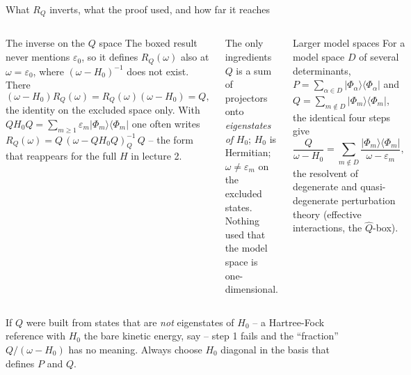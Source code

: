 \documentclass[aspectratio=169,10pt]{beamer}
\newcommand{\warnbox}[1]{%
  \begin{tcolorbox}[colback=palewarm,colframe=warm,title={\bfseries A trap to avoid}]
  #1
  \end{tcolorbox}}
\newcommand{\ketbra}[2]{\vert #1\rangle\langle #2\vert}
\begin{document}
\begin{frame}[shrink=15]{What \(R_Q\) inverts, what the proof used, and how far it reaches}
\begin{columns}[T]
\begin{block}{The inverse on the \(Q\) space}
The boxed result never mentions \(\varepsilon_0\), so it defines \(R_Q(\omega)\) also at \(\omega=\varepsilon_0\), where \((\omega-H_0)^{-1}\) does not exist. There
\[
(\omega-H_0)R_Q(\omega)=R_Q(\omega)(\omega-H_0)=Q ,
\]
the identity on the excluded space only. With \(QH_0Q=\sum_{m\ge1}\varepsilon_m\ketbra{\Phi_m}{\Phi_m}\) one often writes
\(R_Q(\omega)=Q\,(\omega-QH_0Q)^{-1}_{Q}\,Q\) -- the form that reappears for the full \(H\) in lecture 2.
\end{block}
\begin{block}{The only ingredients}
\(Q\) is a sum of projectors onto \emph{eigenstates of} \(H_0\); \(H_0\) is Hermitian; \(\omega\ne\varepsilon_m\) on the excluded states. Nothing used that the model space is one-dimensional.
\end{block}
\begin{block}{Larger model spaces}
For a model space \(D\) of several determinants, \(P=\sum_{\alpha\in D}\ketbra{\Phi_\alpha}{\Phi_\alpha}\) and \(Q=\sum_{m\notin D}\ketbra{\Phi_m}{\Phi_m}\), the identical four steps give
\[
\frac{Q}{\omega-H_0}=\sum_{m\notin D}\frac{\ketbra{\Phi_m}{\Phi_m}}{\omega-\varepsilon_m},
\]
the resolvent of degenerate and quasi-degenerate perturbation theory (effective interactions, the \(\hat Q\)-box).
\end{block}
\end{columns}
\vspace{0.3em}
\warnbox{If \(Q\) were built from states that are \emph{not} eigenstates of \(H_0\) -- a Hartree-Fock reference with \(H_0\) the bare kinetic energy, say -- step 1 fails and the ``fraction'' \(Q/(\omega-H_0)\) has no meaning. Always choose \(H_0\) diagonal in the basis that defines \(P\) and \(Q\).}
\end{frame}
\end{document}
